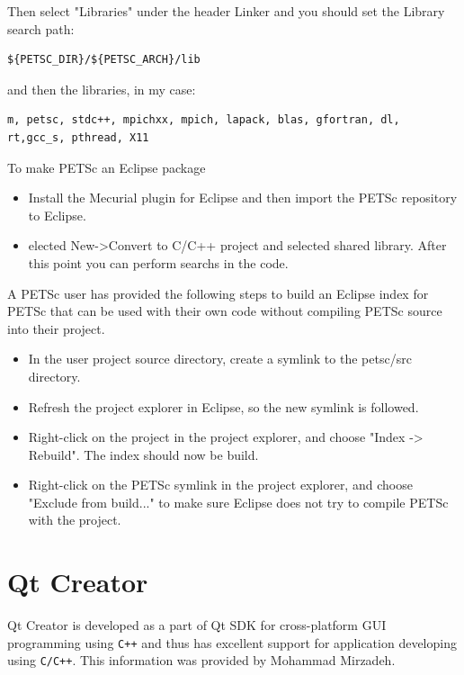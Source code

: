 {{{Then select "Libraries" under the header Linker
and you should set the Library search path:
\begin{verbatim}
${PETSC_DIR}/${PETSC_ARCH}/lib
\end{verbatim}


and then the libraries, in my case:
\begin{verbatim}
m, petsc, stdc++, mpichxx, mpich, lapack, blas, gfortran, dl, rt,gcc_s, pthread, X11
\end{verbatim}


To make PETSc an Eclipse package
\begin{itemize}
\item Install the Mecurial plugin for Eclipse and then import the PETSc repository to Eclipse.
\item elected New->Convert to C/C++ project and selected shared library. After this point you can perform searchs in the code.
\end{itemize}

  A PETSc user has provided the following steps to build an Eclipse index for PETSc that can be used with their own code without compiling PETSc source into their project.
\begin{itemize}
\item In the user project source directory, create a symlink to the petsc/src directory.
\item Refresh the project explorer in Eclipse, so the new symlink is followed.
\item Right-click on the project in the project explorer, and choose "Index -> Rebuild". The index should now be build.
\item Right-click on the PETSc symlink in the project explorer, and choose "Exclude from build..." to make sure Eclipse does not try to compile PETSc with the project.
\end{itemize}

\section{Qt Creator} 

 Qt Creator is developed as a part of Qt SDK for cross-platform GUI programming using \texttt{C++} and thus has excellent support for application developing using \texttt{C/C++}. This information was provided by Mohammad Mirzadeh.

}}}
